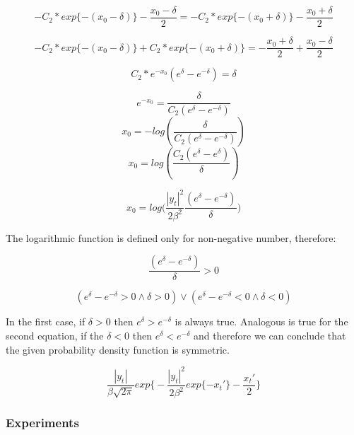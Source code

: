 \documentclass[]{article}
\begin{document}
$$ -C_2 * exp\{-(x_0 - \delta) \} - \frac{x_0 - \delta}{2} = -C_2 * exp\{-(x_0 + \delta) \} - \frac{x_0 + \delta}{2} $$


$$ -C_2 * exp\{-(x_0 - \delta) \} + C_2 * exp\{-(x_0 + \delta) \} =  - \frac{x_0 + \delta}{2} + \frac{x_0 - \delta}{2}  $$

$$ C_2 *  e^{-x_0} ( e^{ \delta} - e^{ -\delta } ) = \delta $$


$$ e^{-x_0}  =  \frac{\delta}{C_2( e^{ \delta} - e^{ -\delta } )} $$
$$ x_0 =  - log(\frac{\delta}{C_2( e^{ \delta} - e^{ -\delta } )} ) $$
$$ x_0 =  log(\frac{C_2( e^{\delta } - e^{ \delta}   )}{ \delta} ) $$

$$ x_0 =  log\Big( \frac{|y_t|^2}{2 \beta^2} \frac{( e^{ \delta} - e^{ -\delta }   )}{ \delta} \Big) $$

The logarithmic function is defined only for non-negative number, therefore:

$$ \frac{( e^{ \delta} - e^{ -\delta }   )}{ \delta} > 0 $$ 

$$ ( e^{ \delta} - e^{ -\delta } > 0 \land \delta >0 ) \lor ( e^{ \delta} - e^{ -\delta } < 0 \land \delta <0 )$$


In the first case, if $\delta >0$ then $ e^\delta > e^{-\delta} $ is always true. Analogous is true for the second equation, if the $\delta <0$ then $ e^\delta < e^{-\delta} $ and therefore we can conclude that the given probability density function is symmetric.

$$\frac{|y_t|}{\beta \sqrt{2 \pi}} exp \bigg\{ -\frac{|y_t|^2}{2 \beta^2} exp\{-x_t' \} - \frac{x_t'}{2} \bigg\}$$

\subsubsection*{Experiments}


\newpage
\end{document}
